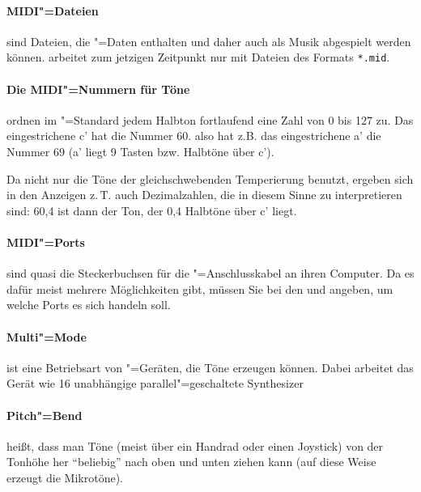 \paragraph{MIDI"=Dateien}\label{sec:DV_MIDIFILE} sind Dateien,
  die "=Daten enthalten und daher auch als
  Musik abgespielt werden können. \mutabor{} arbeitet zum jetzigen
  Zeitpunkt nur mit Dateien des Formats \texttt{*.mid}.

\paragraph{Die MIDI"=Nummern für Töne}\label{sec:DV_MIDINOTES}
  ordnen im "=Standard jedem Halbton
  fortlaufend eine Zahl von 0 bis 127 zu. Das eingestrichene c' hat
  die Nummer 60. also hat z.B. das eingestrichene a' die Nummer 69 (a'
  liegt 9 Tasten bzw. Halbtöne über c').

  Da \mutabor{} nicht nur die Töne der gleichschwebenden Temperierung
  benutzt, ergeben sich in den Anzeigen z.\,T. auch Dezimalzahlen, die
  in diesem Sinne zu interpretieren sind: 60,4 ist dann der Ton, der
  0,4 Halbtöne über c' liegt.

\paragraph{MIDI"=Ports}\label{sec:DV_PORT} sind quasi die
  Steckerbuchsen für die "=Anschlusskabel an
  ihren Computer. Da es dafür meist mehrere Möglichkeiten gibt, müssen
  Sie bei den  und
   angeben, um welche Ports es sich
  handeln soll.

\paragraph{Multi"=Mode}\label{sec:DV_MULTI} ist eine
  Betriebsart von "=Geräten, die Töne
  erzeugen können. Dabei arbeitet das Gerät wie 16 unabhängige
  parallel"=geschaltete Synthesizer

\paragraph{Pitch"=Bend}\label{sec:DV_PITCH} heißt, dass man Töne
  (meist über ein Handrad oder einen Joystick) von der Tonhöhe her
  "`beliebig"' nach oben und unten ziehen kann (auf diese Weise
  erzeugt \mutabor{} die Mikrotöne).

